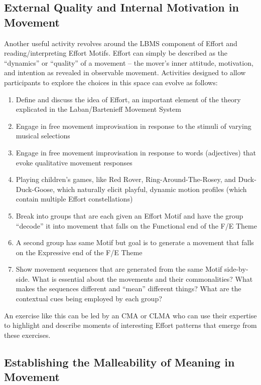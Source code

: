 \documentclass[arts,article,submit,moreauthors,pdftex,10pt,a4paper]{mdpi}
\begin{document}
\subsection{External Quality and Internal Motivation in Movement}
Another useful activity revolves around the LBMS component of Effort and reading/interpreting Effort Motifs. Effort can simply be described as the ``dynamics'' or ``quality'' of a movement --  the mover’s inner attitude, motivation, and intention as revealed in observable movement.   Activities designed to allow participants to explore the choices in this space can evolve as follows:
\begin{enumerate}
\item Define and discuss the idea of Effort, an important element of the theory explicated in the Laban/Bartenieff Movement System
\item Engage in free movement improvisation in response to the stimuli of varying musical selections
\item Engage in free movement improvisation in response to words (adjectives) that evoke qualitative movement responses
\item Playing children’s games, like Red Rover, Ring-Around-The-Rosey, and Duck-Duck-Goose, which naturally elicit playful, dynamic motion profiles (which contain multiple Effort constellations)
\item Break into groups that are each given an Effort Motif and have the group ``decode'' it into movement that falls on the Functional end of the F/E Theme
\item A second group has same Motif but goal is to generate a movement that falls on the Expressive end of the F/E Theme
\item Show movement sequences that are generated from the same Motif side-by-side. What is essential about the movements and their commonalities? What makes the sequences different and ``mean'' different things? What are the contextual cues being employed by each group?
\end{enumerate}
An exercise like this can be led by an CMA or CLMA who can use their expertise to highlight and describe moments of interesting Effort patterns that emerge from these exercises.

\subsection{Establishing the Malleability of Meaning in Movement}

 
\end{document}
